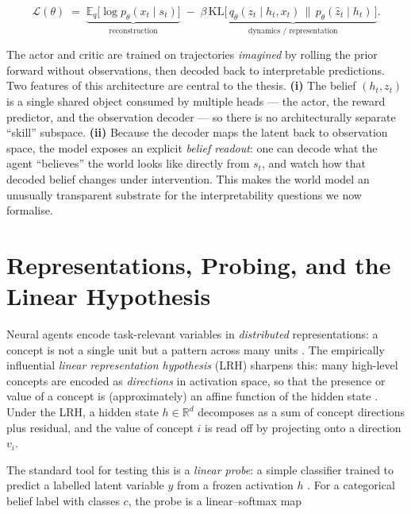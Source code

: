\begin{equation}
    \mathcal{L}(\theta) \;=\;
        \underbrace{\mathbb{E}_{q}\big[\log p_\theta(x_t \mid s_t)\big]}_{\text{reconstruction}}
        \;-\; \beta\,
        \underbrace{\mathrm{KL}\!\big[\,q_\theta(z_t \mid h_t, x_t)\,\big\|\,p_\theta(\hat z_t \mid h_t)\,\big]}_{\text{dynamics / representation}}.
    \label{eq:elbo}
\end{equation}

The actor and critic are trained on trajectories \emph{imagined} by rolling the
prior forward without observations, then decoded back to interpretable
predictions. Two features of this architecture are central to the thesis.
\textbf{(i)} The belief $(h_t, z_t)$ is a single shared object consumed by
multiple heads --- the actor, the reward predictor, and the observation decoder
--- so there is no architecturally separate ``skill'' subspace. \textbf{(ii)}
Because the decoder maps the latent back to observation space, the model exposes
an explicit \emph{belief readout}: one can decode what the agent ``believes'' the
world looks like directly from $s_t$, and watch how that decoded belief changes
under intervention. This makes the world model an unusually transparent
substrate for the interpretability questions we now formalise.

\section{Representations, Probing, and the Linear Hypothesis}
\label{sec:bg-representations}

Neural agents encode task-relevant variables in \emph{distributed}
representations: a concept is not a single unit but a pattern across many units
\citep{rumelhart1986learning}. The empirically influential \emph{linear
representation hypothesis} (LRH) sharpens this: many high-level concepts are
encoded as \emph{directions} in activation space, so that the presence or value
of a concept is (approximately) an affine function of the hidden state
\citep{mikolov2013linguistic,park2024linear}. Under the LRH, a hidden state
$h \in \mathbb{R}^{d}$ decomposes as a sum of concept directions plus residual,
and the value of concept $i$ is read off by projecting onto a direction $v_i$.

The standard tool for testing this is a \emph{linear probe}: a simple classifier
trained to predict a labelled latent variable $y$ from a frozen activation $h$
\citep{alain2017understanding}. For a categorical belief label with classes
$c$, the probe is a linear--softmax map

